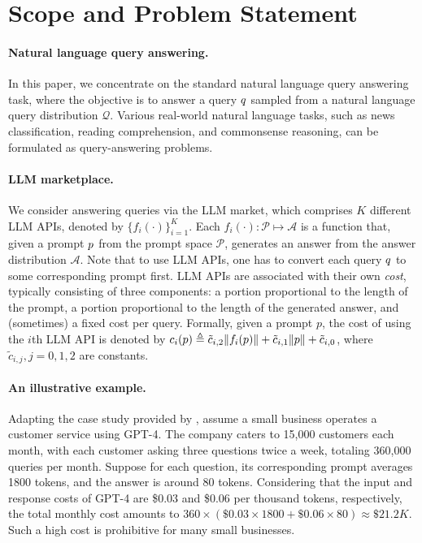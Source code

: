 \documentclass{article}
\begin{document}
\section{Scope and Problem Statement}\label{sec:AML:Prelim}

\paragraph{Natural language query answering.}
In this paper, we concentrate on the standard natural language query answering task, where the objective is to answer a query $q$ sampled from a natural language query distribution $\mathcal{Q}$. Various real-world natural language tasks, such as news classification, reading comprehension, and commonsense reasoning,  can be formulated as query-answering problems.

\paragraph{LLM marketplace.}
We consider answering queries via the LLM market, which comprises $K$ different LLM APIs, denoted by $\{f_i(\cdot)\}_{i=1}^{K}$. Each $f_i(\cdot): \mathcal{P}\mapsto \mathcal{A}$ is a function that, given a prompt $p$ from the prompt space $\mathcal{P}$, generates an answer  from the answer distribution $\mathcal{A}$. 
Note that to use LLM APIs, one has to convert each query $q$ to some corresponding prompt first. LLM APIs are associated with their own \textit{cost}, typically consisting of three components: a portion proportional to the length of the prompt, a portion proportional to the length of the generated answer, and (sometimes) a fixed cost per query. Formally, given a prompt $p$, the cost of using the $i$th LLM API is denoted by $c_i(p) \triangleq \tilde{c}_{i,2}\|f_i(p)\|+ \tilde{c}_{i,1} \|p\| + \tilde{c}_{i,0}$, where $\tilde{c}_{i,j},j=0,1,2$ are constants. 

\paragraph{An illustrative example.} Adapting the case study provided by \cite{CostEstChatGPT}, assume a small business operates a customer service using GPT-4. The company caters to 15,000 customers each month, with each customer asking three questions twice a week, totaling 360,000 queries per month. Suppose for each question, its corresponding prompt averages 1800 tokens, and the answer is around 80 tokens. Considering that the input and response costs of GPT-4 are \$0.03 and \$0.06 per thousand tokens, respectively, the total monthly cost amounts to $360\times (\$0.03\times 1800+\$0.06\times 80)\approx\$21.2K$. 
 Such a high cost is prohibitive for many small businesses.
\end{document}
